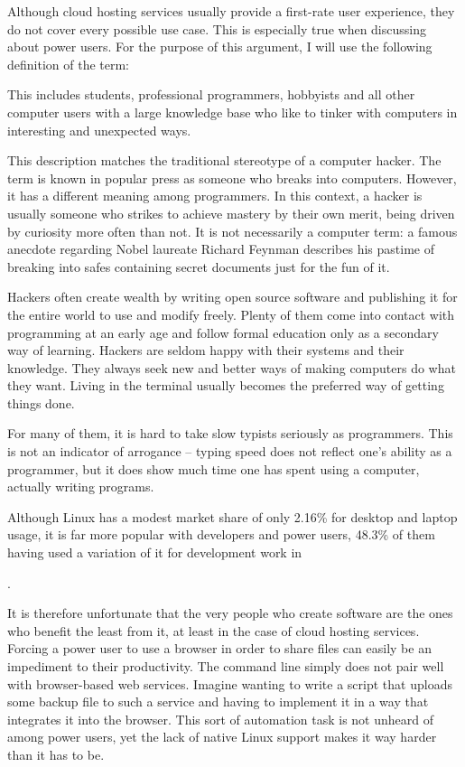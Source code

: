 Although cloud hosting services usually provide a first-rate user experience, they do not cover every possible use case. This is especially true when discussing about power users. For the purpose of this argument, I will use the following definition of the term:


This includes students, professional programmers, hobbyists and all other computer users with a large knowledge base who like to tinker with computers in interesting and unexpected ways.

This description matches the traditional stereotype of a computer hacker. The term is known in popular press as someone who breaks into computers. However, it has a different meaning among programmers. In this context, a hacker is usually someone who strikes to achieve mastery by their own merit, being driven by curiosity more often than not. It is not necessarily a computer term: a famous anecdote regarding Nobel laureate Richard Feynman describes his pastime of breaking into safes containing secret documents just for the fun of it\cite{feynman}.

Hackers often create wealth by writing open source software and publishing it for the entire world to use and modify freely\cite{hackers_and_painters}. Plenty of them come into contact with programming at an early age and follow formal education only as a secondary way of learning. Hackers are seldom happy with their systems and their knowledge. They always seek new and better ways of making computers do what they want. Living in the terminal usually becomes the preferred way of getting things done.

For many of them, it is hard to take slow typists seriously as programmers. This is not an indicator of arrogance -- typing speed does not reflect one's ability as a programmer, but it does show much time one has spent using a computer, actually writing programs.

Although Linux has a modest market share of only 2.16\% for desktop and laptop usage\cite{linux_market_share}, it is far more popular with developers and power users, 48.3\% of them having used a variation of it for development work in \date{2018}.\cite{stack_overflow_developer_survey_results}

It is therefore unfortunate that the very people who create software are the ones who benefit the least from it, at least in the case of cloud hosting services. Forcing a power user to use a browser in order to share files can easily be an impediment to their productivity. The command line simply does not pair well with browser-based web services. Imagine wanting to write a script that uploads some backup file to such a service and having to implement it in a way that integrates it into the browser. This sort of automation task is not unheard of among power users, yet the lack of native Linux support makes it way harder than it has to be.
